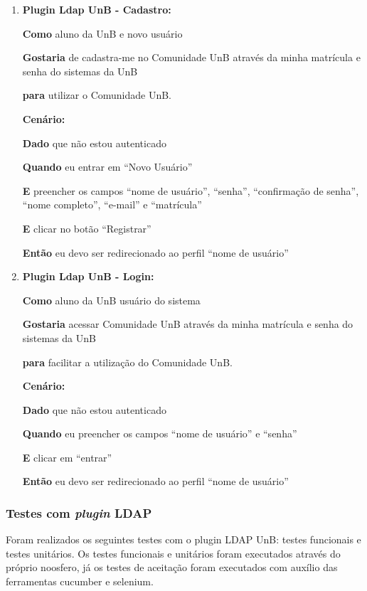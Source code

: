 \begin{enumerate}

\item \textbf{Plugin Ldap UnB - Cadastro:}

\textbf{Como} aluno da UnB e novo usuário

\textbf{Gostaria} de cadastra-me no Comunidade UnB através da minha matrícula e senha do sistemas da UnB

\textbf{para} utilizar o Comunidade UnB.

\textbf{Cenário:}

\textbf{Dado} que não estou autenticado

\textbf{Quando} eu entrar em ``Novo Usuário''

\textbf{E} preencher os campos ``nome de usuário'', ``senha'', ``confirmação de senha'', ``nome completo'', ``e-mail'' e ``matrícula''

\textbf{E} clicar no botão ``Registrar''

\textbf{Então} eu devo ser redirecionado ao perfil ``nome de usuário''


\item  \textbf{Plugin Ldap UnB - Login:}

\textbf{Como} aluno da UnB usuário do sistema

\textbf{Gostaria} acessar Comunidade UnB através da minha matrícula e senha do sistemas da UnB

\textbf{para} facilitar a utilização do Comunidade UnB.

\textbf{Cenário:}

\textbf{Dado} que não estou autenticado

\textbf{Quando} eu preencher os campos ``nome de usuário'' e ``senha''

\textbf{E} clicar em ``entrar''

\textbf{Então} eu devo ser redirecionado ao perfil ``nome de usuário''

\end{enumerate}

\subsubsection{Testes com \textit{plugin} LDAP}
%
Foram realizados os seguintes testes  com o plugin LDAP UnB: testes funcionais e testes 
unitários. Os testes funcionais e unitários foram executados através 
do próprio noosfero, já os testes de aceitação foram executados com auxílio das ferramentas cucumber e selenium.
%
